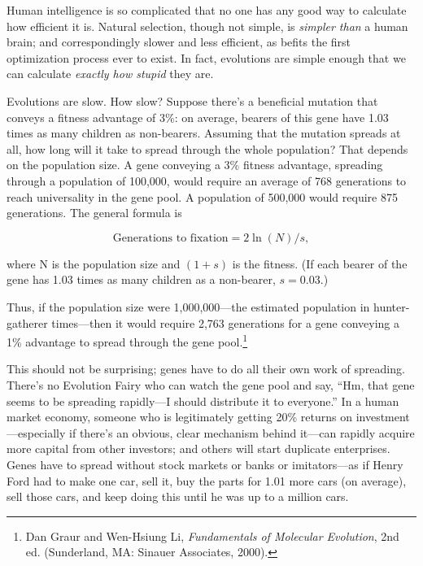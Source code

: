 {{
 Human intelligence is so complicated that no one has any good way
to calculate how efficient it is. Natural selection, though not simple,
is \textit{simpler than} a human brain; and correspondingly slower and
less efficient, as befits the first optimization process ever to exist.
In fact, evolutions are simple enough that we can calculate
\textit{exactly how stupid} they are.}

{
 Evolutions are slow. How slow? Suppose there's a
beneficial mutation that conveys a fitness advantage of 3\%: on
average, bearers of this gene have 1.03 times as many children as
non-bearers. Assuming that the mutation spreads at all, how long will
it take to spread through the whole population? That depends on the
population size. A gene conveying a 3\% fitness advantage, spreading
through a population of 100,000, would require an average of 768
generations to reach universality in the gene pool. A population of
500,000 would require 875 generations. The general formula is}

\begin{equation*}
 \text{Generations to fixation} = 2 \ln(N) / s,
\end{equation*}


{
 where N is the population size and $(1 + s)$ is the fitness. (If
each bearer of the gene has 1.03 times as many children as a
non-bearer, $s = 0.03$.) }

{
 Thus, if the population size were 1,000,000---the estimated
population in hunter-gatherer times---then it would require 2,763
generations for a gene conveying a 1\% advantage to spread through the
gene pool.\footnote{Dan Graur and Wen-Hsiung Li, \textit{Fundamentals of Molecular
Evolution}, 2nd ed. (Sunderland, MA: Sinauer Associates, 2000).}}

{
 This should not be surprising; genes have to do all their own work
of spreading. There's no Evolution Fairy who can watch
the gene pool and say, ``Hm, that gene seems to be
spreading rapidly---I should distribute it to
everyone.'' In a human market economy, someone who is
legitimately getting 20\% returns on investment---especially if
there's an obvious, clear mechanism behind it---can
rapidly acquire more capital from other investors; and others will
start duplicate enterprises. Genes have to spread without stock markets
or banks or imitators---as if Henry Ford had to make one car, sell it,
buy the parts for 1.01 more cars (on average), sell those cars, and
keep doing this until he was up to a million cars.}

}
